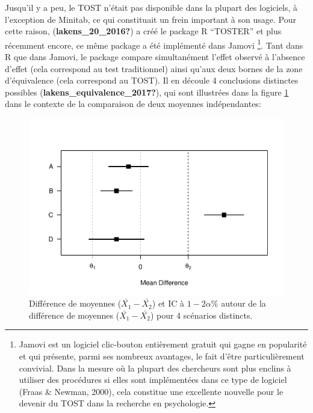 \documentclass[
  english,
  man]{apa6}
\begin{document}
Jusqu'il y a peu, le TOST n'était pas disponible dans la plupart des logiciels, à l'exception de Minitab, ce qui constituait un frein important à son usage. Pour cette raison, (\textbf{lakens\_20\_2016?}) a créé le package R ``TOSTER'' et plus récemment encore, ce même package a été implémenté dans Jamovi \footnote{Jamovi est un logiciel clic-bouton entièrement gratuit qui gagne en popularité et qui présente, parmi ses nombreux avantages, le fait d'être particulièrement convivial. Dans la mesure où la plupart des chercheurs sont plus enclins à utiliser des procédures si elles sont implémentées dans ce type de logiciel (Fraas $\&$ Newman, 2000), cela constitue une excellente nouvelle pour le devenir du TOST dans la recherche en psychologie.}. Tant dans R que dans Jamovi, le package compare simultanément l'effet observé à l'absence d'effet (cela correspond au test traditionnel) ainsi qu'aux deux bornes de la zone d'équivalence (cela correspond au TOST). Il en découle 4 conclusions distinctes possibles (\textbf{lakens\_equivalence\_2017?}), qui sont illustrées dans la figure \ref{fig:equiv1} dans le contexte de la comparaison de deux moyennes indépendantes:

\begin{figure}

{\centering \includegraphics[width=0.8\linewidth]{chp5_files/figure-latex/equiv1-1} 

}

\caption{Différence de moyennes ($\bar{X_1}-\bar{X_2}$) et IC à $1-2\alpha\%$ autour de la différence de moyennes ($\bar{X_1}-\bar{X_2}$) pour 4 scénarios distincts.}\label{fig:equiv1}
\end{figure}
\end{document}
